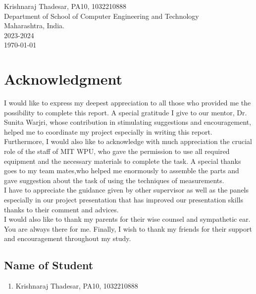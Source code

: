 \documentclass[openany]{report}
\begin{document}
\begin{titlepage}
    \Large{
        Krishnaraj Thadesar, PA10, 1032210888\\
    }
    \vspace{0.5\baselineskip} %
    \LARGE{
        Department of School of Computer Engineering and Technology\\
        Maharashtra, India.\\
        2023-2024\\
    }
    \today

\end{titlepage}


\tableofcontents
\thispagestyle{empty}
\clearpage

\chapter*{Acknowledgment}
\thispagestyle{empty}

I would like to express my deepest appreciation to all those who provided me the possibility to complete this report. A special gratitude I give to our mentor, Dr. Sunita Warjri, whose contribution in stimulating suggestions and encouragement, helped me to coordinate my project especially in writing this report.\\

Furthermore, I would also like to acknowledge with much appreciation the crucial role of the staff of MIT WPU, who gave the permission to use all required equipment and the necessary materials to complete the task. A special thanks goes to my team mates,who helped me enormously to assemble the parts and gave suggestion about the task of using the techniques of measurements.\\

I have to appreciate the guidance given by other supervisor as well as the panels especially in our project presentation that has improved our presentation skills thanks to their comment and advices.\\

I would also like to thank my parents for their wise counsel and sympathetic ear. You are always there for me. Finally, I wish to thank my friends for their support and encouragement throughout my study.



\section*{Name of Student}
\begin{enumerate}
    \item Krishnaraj Thadesar, PA10, 1032210888
\end{enumerate}
\end{document}

